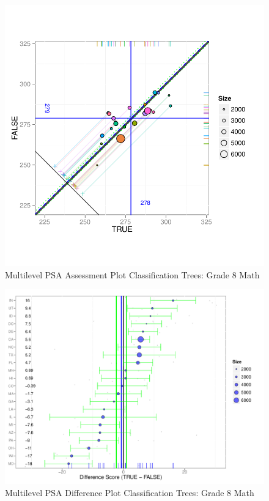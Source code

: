 \documentclass[letterpaper,12p,twoside]{article} %
\begin{document}
\begin{figure}[h!]
\begin{center}
\includegraphics[width=\textwidth]{../Figures2009/g8math-mlpsa-ctree-circ.pdf}
\caption{Multilevel PSA Assessment Plot Classification Trees: Grade 8 Math}
\end{center}
\end{figure}

\begin{figure}[h!]
\begin{center}
\includegraphics[width=\textwidth]{../Figures2009/g8math-mlpsa-ctree-diff.pdf}
\caption{Multilevel PSA Difference Plot Classification Trees: Grade 8 Math}
\end{center}
\end{figure}
\end{document}
